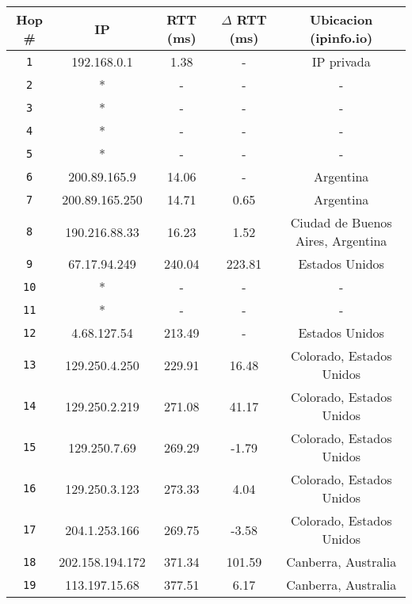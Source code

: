 \begin{table}[ht]\begin{center}
    \begin{tabular}{|c|c|c|c|c|}
    \hline
    \textbf{Hop \#} & \textbf{IP}& \textbf{RTT (ms)} & \textbf{$\Delta$ RTT (ms)} & \textbf{Ubicacion (ipinfo.io)} \\ \hline
    \texttt{1} & 192.168.0.1      & 1.38    & -       & IP privada  \\ \hline
    \texttt{2} & *                & -       & -       & -   \\ \hline
    \texttt{3} & *                & -       & -       & -   \\ \hline
    \texttt{4} & *                & -       & -       & -   \\ \hline
    \texttt{5} & *                & -       & -       & -   \\ \hline
    \texttt{6} & 200.89.165.9     & 14.06   & -       & Argentina    \\ \hline
    \texttt{7} & 200.89.165.250   & 14.71    & 0.65   & Argentina   \\ \hline
    \texttt{8} & 190.216.88.33    & 16.23    & 1.52  & Ciudad de Buenos Aires, Argentina   \\ \hline
    \texttt{9} & 67.17.94.249     & 240.04  & 223.81 & Estados Unidos   \\ \hline
    \texttt{10} & *               & -       & -       & -   \\ \hline
    \texttt{11} & *               & -       & -       & -    \\ \hline
    \texttt{12} & 4.68.127.54     & 213.49  & -       & Estados Unidos   \\ \hline
    \texttt{13} & 129.250.4.250   & 229.91  & 16.48    & Colorado, Estados Unidos   \\ \hline
    \texttt{14} & 129.250.2.219   & 271.08  & 41.17   & Colorado, Estados Unidos   \\ \hline
    \texttt{15} & 129.250.7.69    & 269.29  & -1.79   & Colorado, Estados Unidos   \\ \hline
    \texttt{16} & 129.250.3.123   & 273.33  & 4.04    & Colorado, Estados Unidos    \\ \hline
    \texttt{17} & 204.1.253.166   & 269.75  & -3.58   & Colorado, Estados Unidos   \\ \hline
    \texttt{18} & 202.158.194.172 & 371.34  & 101.59   & Canberra, Australia   \\ \hline
    \texttt{19} & 113.197.15.68   & 377.51  & 6.17    & Canberra, Australia   \\ \hline

\end{tabular}
\end{center}
\end{table}
